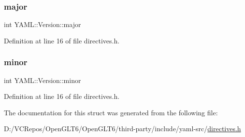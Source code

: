 \subsubsection{\texorpdfstring{major}{major}}
{\footnotesize\ttfamily int Y\+A\+M\+L\+::\+Version\+::major}



Definition at line 16 of file directives.\+h.

\mbox{\label{struct_y_a_m_l_1_1_version_a1cda0e2892871497ed5f9d7937cf4bdb}} 
\subsubsection{\texorpdfstring{minor}{minor}}
{\footnotesize\ttfamily int Y\+A\+M\+L\+::\+Version\+::minor}



Definition at line 16 of file directives.\+h.



The documentation for this struct was generated from the following file\+:\begin{DoxyCompactItemize}
\item 
D\+:/\+V\+C\+Repos/\+Open\+G\+L\+T6/\+Open\+G\+L\+T6/third-\/party/include/yaml-\/src/\mbox{\hyperlink{directives_8h}{directives.\+h}}\end{DoxyCompactItemize}
